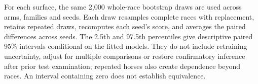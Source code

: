 For each surface, the same 2,000 whole-race bootstrap draws are used across arms, families and seeds. Each draw resamples complete races with replacement, retains repeated draws, recomputes each seed's score, and averages the paired differences across seeds. The 2.5th and 97.5th percentiles give descriptive paired 95\% intervals conditional on the fitted models. They do not include retraining uncertainty, adjust for multiple comparisons or restore confirmatory inference after prior test examination; repeated horses also create dependence beyond races. An interval containing zero does not establish equivalence.
